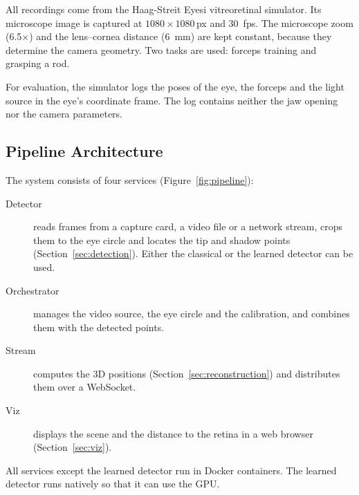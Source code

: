 \documentclass[english]{tum-article}
\begin{document}
All recordings come from the Haag-Streit Eyesi vitreoretinal simulator. Its
microscope image is captured at $1080 \times 1080$\,px and \SI{30}{fps}. The
microscope zoom (\num{6.5}$\times$) and the lens--cornea distance (\SI{6}{mm})
are kept constant, because they determine the camera geometry. Two tasks are
used: forceps training and grasping a rod.

For evaluation, the simulator logs the poses of the eye, the forceps and the
light source in the eye's coordinate frame. The log contains neither the jaw
opening nor the camera parameters.

\subsection{Pipeline Architecture}
\label{sec:system-pipeline}

The system consists of four services (Figure~\ref{fig:pipeline}):
\begin{description}
  \item[Detector] reads frames from a capture card, a video file or a network
    stream, crops them to the eye circle and locates the tip and shadow points
    (Section~\ref{sec:detection}). Either the classical or the learned detector
    can be used.
  \item[Orchestrator] manages the video source, the eye circle and the
    calibration, and combines them with the detected points.
  \item[Stream] computes the 3D positions (Section~\ref{sec:reconstruction})
    and distributes them over a WebSocket.
  \item[Viz] displays the scene and the distance to the retina in a web browser
    (Section~\ref{sec:viz}).
\end{description}
All services except the learned detector run in Docker containers. The learned
detector runs natively so that it can use the GPU.
\end{document}
